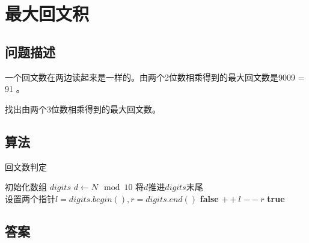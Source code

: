 \section{最大回文积}
\subsection{问题描述}
\begin{tcolorbox}
	一个回文数在两边读起来是一样的。由两个2位数相乘得到的最大回文数是9009 = 91 。

	找出由两个3位数相乘得到的最大回文数。
\end{tcolorbox}

\subsection{算法}
\begin{algorithm}
	\caption{回文数判定}
	\begin{algorithmic}[1]
		\State 初始化数组 $digits$
		\State $d \gets N \mod 10$
		\State $将d推进digits末尾$
		\EndWhile
		\State $设置两个指针 l=digits.begin(), r = digits.end()$
		\Return \textbf{false}
		\EndIf
		\State $++l$
		\State $--r$
		\EndWhile
		\Return \textbf{true}
		\EndFunction
	\end{algorithmic}
\end{algorithm}

\subsection{答案}
